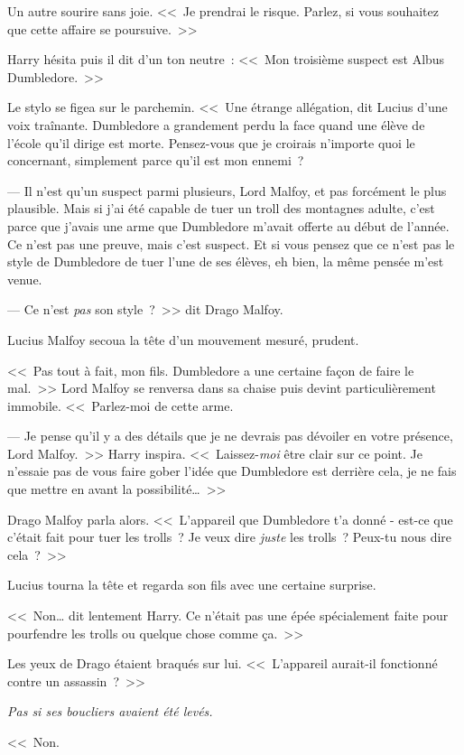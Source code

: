 Un autre sourire sans joie. <<~Je prendrai le risque. Parlez, si vous souhaitez que cette affaire se poursuive.~>>

Harry hésita puis il dit d'un ton neutre~: <<~Mon troisième suspect est Albus Dumbledore.~>>

Le stylo se figea sur le parchemin. <<~Une étrange allégation, dit Lucius d'une voix traînante. Dumbledore a grandement perdu la face quand une élève de l'école qu'il dirige est morte. Pensez-vous que je croirais n'importe quoi le concernant, simplement parce qu'il est mon ennemi~?

--- Il n'est qu'un suspect parmi plusieurs, Lord Malfoy, et pas forcément le plus plausible. Mais si j'ai été capable de tuer un troll des montagnes adulte, c'est parce que j'avais une arme que Dumbledore m'avait offerte au début de l'année. Ce n'est pas une preuve, mais c'est suspect. Et si vous pensez que ce n'est pas le style de Dumbledore de tuer l'une de ses élèves, eh bien, la même pensée m'est venue.

--- Ce n'est \emph{pas} son style~?~>> dit Drago Malfoy.

Lucius Malfoy secoua la tête d'un mouvement mesuré, prudent.

<<~Pas tout à fait, mon fils. Dumbledore a une certaine façon de faire le mal.~>> Lord Malfoy se renversa dans sa chaise puis devint particulièrement immobile. <<~Parlez-moi de cette arme.

--- Je pense qu'il y a des détails que je ne devrais pas dévoiler en votre présence, Lord Malfoy.~>> Harry inspira. <<~Laissez-\emph{moi} être clair sur ce point. Je n'essaie pas de vous faire gober l'idée que Dumbledore est derrière cela, je ne fais que mettre en avant la possibilité…~>>

Drago Malfoy parla alors. <<~L'appareil que Dumbledore t'a donné - est-ce que c'était fait pour tuer les trolls~? Je veux dire \emph{juste} les trolls~? Peux-tu nous dire cela~?~>>

Lucius tourna la tête et regarda son fils avec une certaine surprise.

<<~Non… dit lentement Harry. Ce n'était pas une épée spécialement faite pour pourfendre les trolls ou quelque chose comme ça.~>>

Les yeux de Drago étaient braqués sur lui. <<~L'appareil aurait-il fonctionné contre un assassin~?~>>

\emph{Pas si ses boucliers avaient été levés.}

<<~Non.

